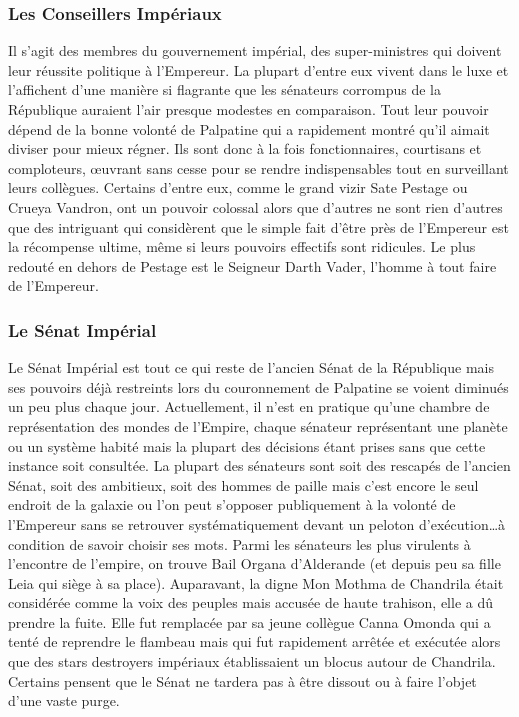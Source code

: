 \documentclass[twoside]{article}
\begin{document}
\subsubsection{Les Conseillers Impériaux}
Il s'agit des membres du gouvernement impérial, des super-ministres qui doivent leur réussite politique à l'Empereur. La plupart d'entre eux vivent dans le luxe et l'affichent d'une manière si flagrante que les sénateurs corrompus de la République auraient l'air presque modestes en comparaison. Tout leur pouvoir dépend de la bonne volonté de Palpatine qui a rapidement montré qu'il aimait diviser pour mieux régner. Ils sont donc à la fois fonctionnaires, courtisans et comploteurs, \oe uvrant sans cesse pour se rendre indispensables tout en surveillant leurs collègues. Certains d'entre eux, comme le grand vizir Sate Pestage ou Crueya Vandron, ont un pouvoir colossal alors que d'autres ne sont rien d'autres que des intriguant qui considèrent que le simple fait d'être près de l'Empereur est la récompense ultime, même si leurs pouvoirs effectifs sont ridicules. Le plus redouté en dehors de Pestage est le Seigneur Darth Vader, l'homme à tout faire de l'Empereur.

\subsubsection{Le Sénat Impérial}
Le Sénat Impérial est tout ce qui reste de l'ancien Sénat de la République mais ses pouvoirs déjà restreints lors du couronnement de Palpatine se voient diminués un peu plus chaque jour. Actuellement, il n'est en pratique qu'une chambre de représentation des mondes de l'Empire, chaque sénateur représentant une planète ou un système habité mais la plupart des décisions étant prises sans que cette instance soit consultée. La plupart des sénateurs sont soit des rescapés de l'ancien Sénat, soit des ambitieux, soit des hommes de paille mais c'est encore le seul endroit de la galaxie ou l'on peut s'opposer publiquement à la volonté de l'Empereur sans se retrouver systématiquement devant un peloton d'exécution\ldots à condition de savoir choisir ses mots. Parmi les sénateurs les plus virulents à l'encontre de l'empire, on trouve Bail Organa d'Alderande (et depuis peu sa fille Leia qui siège à sa place). Auparavant, la digne Mon Mothma de Chandrila était considérée comme la voix des peuples mais accusée de haute trahison, elle a dû prendre la fuite. Elle fut remplacée par sa jeune collègue Canna Omonda  qui a tenté de reprendre le flambeau mais qui fut rapidement arrêtée et exécutée alors que des stars destroyers impériaux établissaient un blocus autour de Chandrila. Certains pensent que le Sénat ne tardera pas à être dissout ou à faire l'objet d'une vaste purge.
\end{document}
